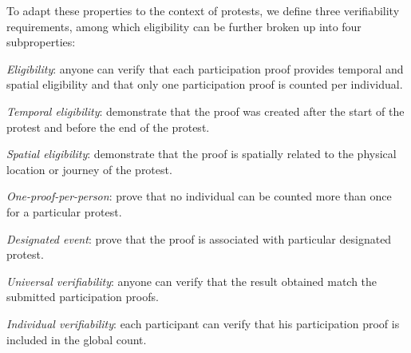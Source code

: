 To adapt these properties to the context of protests, we define three verifiability requirements, among which eligibility can be further broken up into four subproperties:
\begin{requirements}[V]
  \item\label{EligibilityVerif} \emph{Eligibility}: anyone can verify that each participation proof provides temporal and spatial eligibility and that only one participation proof is counted per individual.
    \begin{requirements}
    \item\label{TemporallyRelated} \emph{Temporal eligibility}: demonstrate that the proof was created after the start of the protest and before the end of the protest.
    \item\label{SpatiallyRelated} \emph{Spatial eligibility}: demonstrate that the proof is spatially related to the physical location or journey of the protest.
    \item\label{CountOnce} \emph{One-proof-per-person}: prove that no individual can be counted more than once for a particular protest.
    \item\label{DesignatedEvent} \emph{Designated event}: prove that the proof is associated with particular designated protest.
    \end{requirements}

  \item\label{UniversalVerif} \emph{Universal verifiability}: anyone can verify that the result obtained match the submitted participation proofs.

  \item\label{IndividualVerif} \emph{Individual verifiability}: each participant can verify that his participation proof is included in the global count.
\end{requirements}

